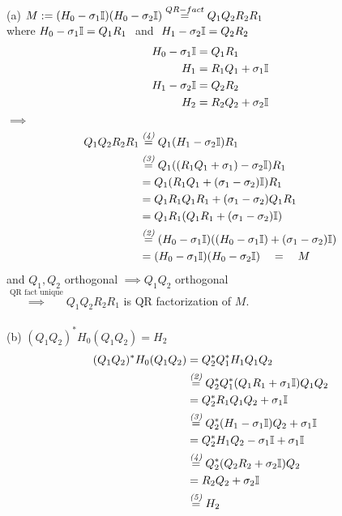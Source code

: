 \begin{SolutionSheet}[\ref{sheet5}]
\begin{onehalfspace}
  \begin{Solution} (a) \Claim $M := (H_0 - \sigma_1 \mathbb{I})(H_0 - \sigma_2 \mathbb{I}) \stackrel{QR-fact}{=} Q_1Q_2R_2R_1$ \\
     where $H_0 - \sigma_1 \mathbb{I} = Q_1R_1 \ $ and $ \ H_1 - \sigma_2 \mathbb{I} = Q_2R_2$ \\
    \Proof \begin{align}
      H_0 - \sigma_1 \mathbb{I} &= Q_1R_1 \\
      H_1 &= R_1Q_1 + \sigma_1 \mathbb{I} \\
      H_1 - \sigma_2 \mathbb{I} &= Q_2R_2 \\
      H_2 &= R_2Q_2 + \sigma_2 \mathbb{I}
    \end{align}
    $\implies$ \begin{align*}
      Q_1Q_2R_2R_1 &\stackrel{\textit{(4)}}{=} Q_1(H_1 - \sigma_2 \mathbb{I})R_1 \\
      &\stackrel{\textit{(3)}}{=} Q_1((R_1Q_1 + \sigma_1) - \sigma_2 \mathbb{I})R_1 \\
      &= Q_1(R_1Q_1 + (\sigma_1 - \sigma_2) \mathbb{I})R_1 \\
      &= Q_1R_1Q_1R_1 + (\sigma_1 - \sigma_2)Q_1R_1 \\
      &= Q_1R_1(Q_1R_1 + (\sigma_1 - \sigma_2)\mathbb{I}) \\
      &\stackrel{\textit{(2)}}{=} (H_0 - \sigma_1 \mathbb{I})((H_0 - \sigma_1 \mathbb{I}) + (\sigma_1 - \sigma_2)\mathbb{I}) \\
      &= (H_0 - \sigma_1 \mathbb{I})(H_0 - \sigma_2 \mathbb{I}) \quad = \quad M 
    \end{align*}
    and $Q_1, Q_2$ orthogonal $\implies Q_1Q_2$ orthogonal\\
    $\stackrel{\text{QR fact unique}}{\implies} Q_1Q_2R_2R_1$ is QR factorization of $M$. \\
    \\
    (b) \Claim $(Q_1Q_2)^* H_0 (Q_1Q_2) = H_2$ \\
    \Proof \begin{align*}
      (Q_1Q_2)^* H_0 (Q_1Q_2) &= Q_2^* Q_1^* H_1 Q_1Q_2 \\
      &\stackrel{\textit{(2)}}{=} Q_2^*Q_1^*(Q_1R_1 + \sigma_1 \mathbb{I})Q_1Q_2 \\
      &= Q_2^*R_1Q_1Q_2 + \sigma_1 \mathbb{I} \\
      & \stackrel{\textit{(3)}}{=} Q_2^*(H_1 - \sigma_1 \mathbb{I})Q_2 + \sigma_1 \mathbb{I} \\
      &= Q_2^*H_1Q_2 - \sigma_1 \mathbb{I} + \sigma_1 \mathbb{I} \\
      & \stackrel{\textit{(4)}}{=} Q_2^* (Q_2R_2 + \sigma_2 \mathbb{I})Q_2 \\
      &= R_2Q_2 + \sigma_2 \mathbb{I} \\
      & \stackrel{\textit{(5)}}{=} H_2
    \end{align*}
  \end{Solution}

  \begin{Solution}[Programming]
  \end{Solution}

\end{onehalfspace}
\end{SolutionSheet}



